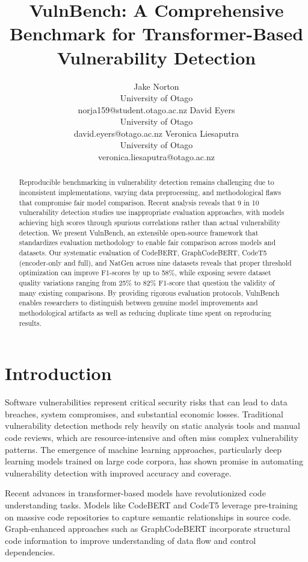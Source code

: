 \documentclass[letterpaper]{article}
\title{VulnBench: A Comprehensive Benchmark for Transformer-Based Vulnerability Detection}
\author{
Jake Norton\\
University of Otago\\
norja159@student.otago.ac.nz
\And
David Eyers\\
University of Otago\\
david.eyers@otago.ac.nz
\And
Veronica Liesaputra\\
University of Otago\\
veronica.liesaputra@otago.ac.nz
}
\begin{document}
\maketitle

\begin{abstract}
	Reproducible benchmarking in vulnerability detection remains challenging due to inconsistent implementations, varying data preprocessing, and methodological flaws that compromise fair model comparison. Recent analysis reveals that 9 in 10 vulnerability detection studies use inappropriate evaluation approaches, with models achieving high scores through spurious correlations rather than actual vulnerability detection. We present VulnBench, an extensible open-source framework that standardizes evaluation methodology to enable fair comparison across models and datasets. Our systematic evaluation of CodeBERT, GraphCodeBERT, CodeT5 (encoder-only and full), and NatGen across nine datasets reveals that proper threshold optimization can improve F1-scores by up to 58\%, while exposing severe dataset quality variations ranging from 25\% to 82\% F1-score that question the validity of many existing comparisons. By providing rigorous evaluation protocols, VulnBench enables researchers to distinguish between genuine model improvements and methodological artifacts as well as reducing duplicate time spent on reproducing results.
\end{abstract}


\section{Introduction}

Software vulnerabilities represent critical security risks that can lead to data breaches, system compromises, and substantial economic losses. Traditional vulnerability detection methods rely heavily on static analysis tools and manual code reviews, which are resource-intensive and often miss complex vulnerability patterns. The emergence of machine learning approaches, particularly deep learning models trained on large code corpora, has shown promise in automating vulnerability detection with improved accuracy and coverage.

Recent advances in transformer-based models have revolutionized code understanding tasks. Models like CodeBERT \citep{feng2020codebert} and CodeT5 \citep{wang2021codet5} leverage pre-training on massive code repositories to capture semantic relationships in source code. Graph-enhanced approaches such as GraphCodeBERT \citep{guo2021graphcodebert} incorporate structural code information to improve understanding of data flow and control dependencies.
\end{document}
